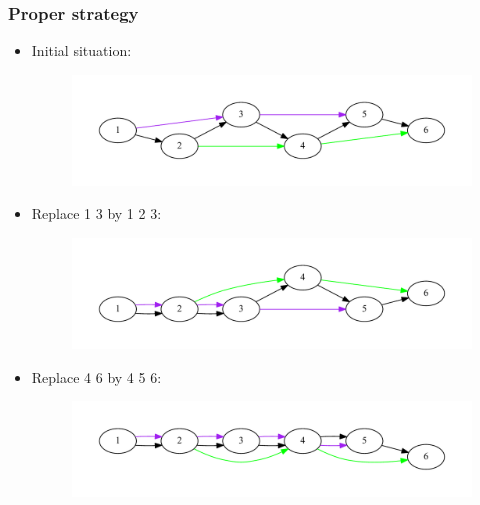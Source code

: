 \documentclass[svgnames,14pt]{beamer}
\begin{document}
\begin{frame}
\frametitle{Proper strategy}
\begin{itemize}
\item Initial situation:
\begin{changemargin}{-1.cm}{-1.cm}
\begin{figure}
\centering
\includegraphics[scale = 0.38]{graph1.pdf}
\end{figure}
\end{changemargin}
\item Replace 1 3 by 1 2 3:
\begin{changemargin}{-1.cm}{-1.cm}
\begin{figure}
\centering
\includegraphics[scale = 0.38]{graph4.pdf}
\end{figure}
\end{changemargin}
\item Replace 4 6 by 4 5 6:
\begin{changemargin}{-1.cm}{-1.cm}
\begin{figure}
\centering
\includegraphics[scale = 0.38]{graph5.pdf}
\end{figure}
\end{changemargin}
\end{itemize}
\end{frame}
\end{document}
